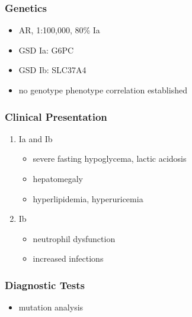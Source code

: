 \documentclass{scrartcl}
\begin{document}
\subsubsection{Genetics}
\label{sec:org4d5e2c0}
\begin{itemize}
\item AR, 1:100,000, 80\% Ia
\item GSD Ia: G6PC
\item GSD Ib: SLC37A4
\item no genotype phenotype correlation established
\end{itemize}

\subsubsection{Clinical Presentation}
\label{sec:org774c02d}
\begin{enumerate}
\item Ia and Ib
\label{sec:org5413c16}
\begin{itemize}
\item severe fasting hypoglycema, lactic acidosis
\item hepatomegaly
\item hyperlipidemia, hyperuricemia
\end{itemize}
\item Ib
\label{sec:org23f821a}
\begin{itemize}
\item neutrophil dysfunction
\item increased infections
\end{itemize}
\end{enumerate}

\subsubsection{Diagnostic Tests}
\label{sec:orgbbf5db1}
\begin{itemize}
\item mutation analysis
\end{itemize}
\end{document}
